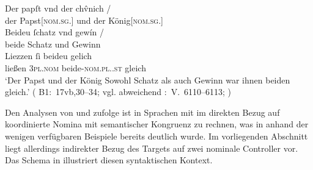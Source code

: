 \begin{exe}
\ex\label{ex:papstkoenig5} %
	\gll Der papſt vnd der chv̂nich {/} \\
		der Papst[\textsc{nom.sg.\MascM}] und der König[\textsc{nom.sg.\MascM}]
		\\
	\textelp{}
	\gll Beideu ſchatz vnd gewín {/} \\
		beide Schatz und Gewinn \\
	\gll Liezzen ſi beideu gelich \\
		ließen \textsc{3pl\subM.nom} beide-\textsc{nom.pl.\NeutM.st} gleich \\
	\trans `Der Papst und der König
		\textelp{}
		Sowohl Schatz als auch Gewinn war ihnen beiden gleich.'
		(%
			B1:~17vb,30--34; vgl. abweichend
			\KC:~V.~6110--6113;
			\cite[202]{schroeder1895}%
		)
\end{exe}

Den Analysen von \citet{wechsler2009} und \citet{wechslerzlatic2003} zufolge
ist in Sprachen mit  im direkten Bezug auf koordinierte
Nomina mit semantischer Kongruenz zu rechnen, was in
 anhand der wenigen verfügbaren Beispiele bereits
deutlich wurde. Im vorliegenden Abschnitt liegt allerdings indirekter Bezug des
Targets  auf zwei nominale Controller vor. Das Schema in
 illustriert diesen syntaktischen Kontext.

